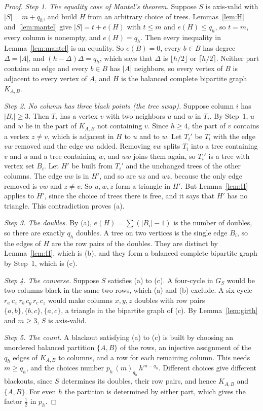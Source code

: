 \begin{proof}
\emph{Step 1. The equality case of Mantel's theorem.} Suppose $S$ is axis-valid with $|S|=m+q_h$, and build $H$ from an arbitrary choice of trees. Lemmas~\ref{lem:H} and~\ref{lem:mantel} give $|S|=t+e(H)$ with $t\le m$ and $e(H)\le q_h$, so $t=m$, every column is nonempty, and $e(H)=q_h$. Then every inequality in Lemma~\ref{lem:mantel} is an equality. So $e(B)=0$, every $b\in B$ has degree $\Delta=|A|$, and $(h-\Delta)\Delta=q_h$, which says that $\Delta$ is $\lfloor h/2\rfloor$ or $\lceil h/2\rceil$. Neither part contains an edge and every $b\in B$ has $|A|$ neighbors, so every vertex of $B$ is adjacent to every vertex of $A$, and $H$ is the balanced complete bipartite graph $K_{A,B}$.

\emph{Step 2. No column has three black points (the tree swap).} Suppose column $i$ has $|B_i|\ge3$. Then $T_i$ has a vertex $v$ with two neighbors $u$ and $w$ in $T_i$. By Step~1, $u$ and $w$ lie in the part of $K_{A,B}$ not containing $v$. Since $h\ge4$, the part of $v$ contains a vertex $z\ne v$, which is adjacent in $H$ to $u$ and to $w$. Let $T_i'$ be $T_i$ with the edge $vw$ removed and the edge $uw$ added. Removing $vw$ splits $T_i$ into a tree containing $v$ and $u$ and a tree containing $w$, and $uw$ joins them again, so $T_i'$ is a tree with vertex set $B_i$. Let $H'$ be built from $T_i'$ and the unchanged trees of the other columns. The edge $uw$ is in $H'$, and so are $uz$ and $wz$, because the only edge removed is $vw$ and $z\ne v$. So $u,w,z$ form a triangle in $H'$. But Lemma~\ref{lem:H} applies to $H'$, since the choice of trees there is free, and it says that $H'$ has no triangle. This contradiction proves (a).

\emph{Step 3. The doubles.} By (a), $e(H)=\sum(|B_i|-1)$ is the number of doubles, so there are exactly $q_h$ doubles. A tree on two vertices is the single edge $B_i$, so the edges of $H$ are the row pairs of the doubles. They are distinct by Lemma~\ref{lem:H}, which is (b), and they form a balanced complete bipartite graph by Step~1, which is (c).

\emph{Step 4. The converse.} Suppose $S$ satisfies (a) to (c). A four-cycle in $G_S$ would be two columns black in the same two rows, which (a) and (b) exclude. A six-cycle $r_a\,c_x\,r_b\,c_y\,r_c\,c_z$ would make columns $x,y,z$ doubles with row pairs $\{a,b\},\{b,c\},\{a,c\}$, a triangle in the bipartite graph of (c). By Lemma~\ref{lem:girth} and $m\ge3$, $S$ is axis-valid.

\emph{Step 5. The count.} A blackout satisfying (a) to (c) is built by choosing an unordered balanced partition $\{A,B\}$ of the rows, an injective assignment of the $q_h$ edges of $K_{A,B}$ to columns, and a row for each remaining column. This needs $m\ge q_h$, and the choices number $p_h\,(m)_{q_h}\,h^{m-q_h}$. Different choices give different blackouts, since $S$ determines its doubles, their row pairs, and hence $K_{A,B}$ and $\{A,B\}$. For even $h$ the partition is determined by either part, which gives the factor $\frac12$ in $p_h$.
\end{proof}

